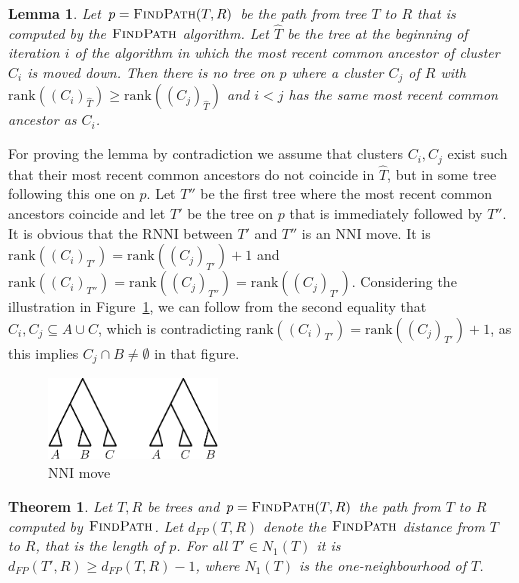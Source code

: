 \documentclass{amsart}
\newtheorem{lemma}{Lemma}
\newtheorem{theorem}{Theorem}
\newcommand{\rnni}{\mathrm{RNNI}}
\newcommand{\findpath}{\textsc{FindPath}}
\newcommand{\rank}{\mathrm{rank}}
\newcommand{\nni}{\mathrm{NNI}}
\begin{document}
\begin{lemma}
    Let $p = \findpath(T,R)$ be the path from tree $T$ to $R$ that is computed by the $\findpath$ algorithm.
    Let $\hat{T}$ be the tree at the beginning of iteration $i$ of the algorithm in which the most recent common ancestor of cluster $C_i$ is moved down.
    Then there is no tree on $p$ where a cluster $C_j$ of $R$ with $\rank((C_i)_{\hat{T}}) \geq \rank((C_j)_{\hat{T}})$ and $i < j$ has the same most recent common ancestor as $C_i$.
\end{lemma}

\proof

For proving the lemma by contradiction we assume that clusters $C_i, C_j$ exist such that their most recent common ancestors do not coincide in $\hat{T}$, but in some tree following this one on $p$.
Let $T''$ be the first tree where the most recent common ancestors coincide and let $T'$ be the tree on $p$ that is immediately followed by $T''$.
It is obvious that the $\rnni$ between $T'$ and $T''$ is an $\nni$ move.
It is $\rank((C_i)_{T'}) = \rank((C_j)_{T'}) + 1$ and $\rank((C_i)_{T''}) = \rank((C_j)_{T''}) = \rank((C_j)_{T'})$.
Considering the illustration in Figure~\ref{fig:nni_move}, we can follow from the second equality that $C_i, C_j \subseteq A \cup C$, which is contradicting $\rank((C_i)_{T'}) = \rank((C_j)_{T'}) + 1$, as this implies $C_j \cap B \neq \emptyset$ in that figure.


\begin{figure}[H]
\centering
\includegraphics[width=0.4\textwidth]{NNI_move}
\vspace{12pt}
\caption{$\nni$ move}
\label{fig:nni_move}
\end{figure}

\endproof

\begin{theorem}
    Let $T,R$ be trees and $p = \findpath(T,R)$ the path from $T$ to $R$ computed by $\findpath$.
    Let $d_{FP}(T,R)$ denote the $\findpath$ distance from $T$ to $R$, that is the length of $p$.
    For all $T' \in N_1(T)$ it is $d_{FP}(T',R) \geq d_{FP}(T,R) - 1$, where $N_1(T)$ is the one-neighbourhood of $T$.
\end{theorem}
\end{document}
